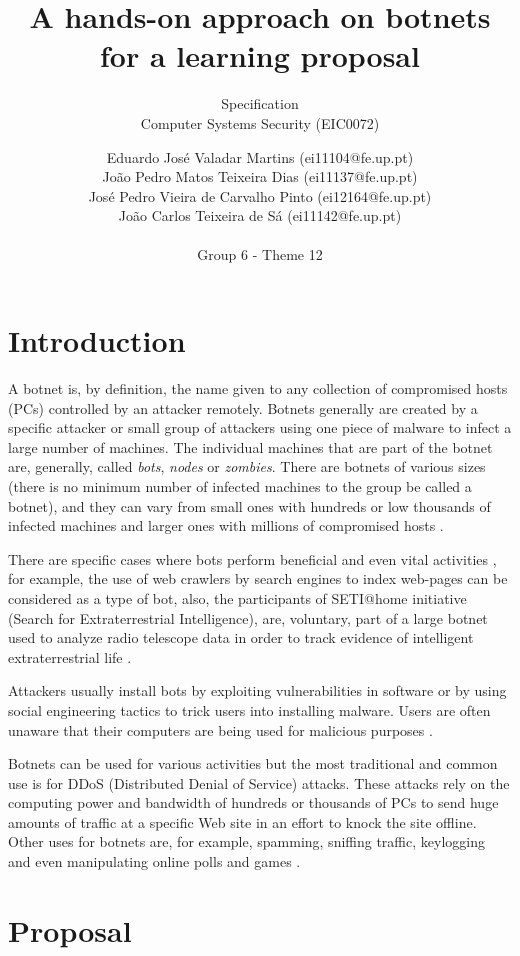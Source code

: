 \documentclass[]{article}
\title{A hands-on approach on botnets for a learning proposal\\}
\subtitle{Specification\\\vspace{10px}
	Computer Systems Security (EIC0072)
}
\author{Eduardo José Valadar Martins (ei11104@fe.up.pt)\\
	João Pedro Matos Teixeira Dias (ei11137@fe.up.pt)\\
	José Pedro Vieira de Carvalho Pinto (ei12164@fe.up.pt)\\
	João Carlos Teixeira de Sá (ei11142@fe.up.pt)\\\\Group 6 - Theme 12\\
}
\begin{document}
\maketitle
\thispagestyle{empty}
\newpage

\tableofcontents
\newpage
\section{Introduction}

A botnet is, by definition, the name given to any collection of compromised hosts (PCs) controlled by an attacker remotely. Botnets generally are created by a specific attacker or small group of attackers using one piece of malware to infect a large number of machines. The individual machines that are part of the botnet are, generally, called \textit{bots}, \textit{nodes} or \textit{zombies}. There are botnets of various sizes (there is no minimum number of infected machines to the group be called a botnet), and they can vary from small ones with hundreds or low thousands of infected machines and larger ones with millions of compromised hosts \cite{website:botnet-def}.

There are specific cases where bots perform beneficial and even vital activities \cite{website:botnet-useful}, for example, the use of web crawlers by search engines to index web-pages can be considered as a type of bot, also, the participants of SETI@home initiative (Search for Extraterrestrial Intelligence), are, voluntary, part of a large botnet used to analyze radio telescope data in order to track evidence of intelligent extraterrestrial life \cite{website:setihome}.

Attackers usually install bots by exploiting vulnerabilities in software or by using social engineering tactics to trick users into installing malware. Users are often unaware that their computers are being used for malicious purposes \cite{website:botnet-useful}.

Botnets can be used for various activities but the most traditional and common use is for DDoS (Distributed Denial of Service) attacks. These attacks rely on the computing power and bandwidth of hundreds or thousands of PCs to send huge amounts of traffic at a specific Web site in an effort to knock the site offline. Other uses for botnets are, for example, spamming, sniffing traffic, keylogging and even manipulating online polls and games \cite{article:honeypot-tracking}. 



\section{Proposal}
\end{document}
